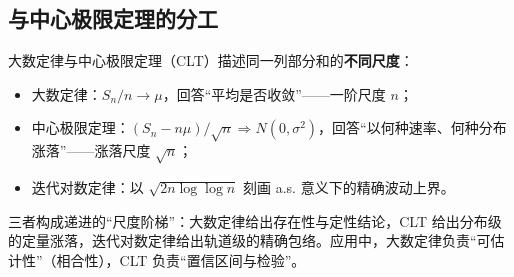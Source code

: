 \subsection{与中心极限定理的分工}

大数定律与中心极限定理（CLT）描述同一列部分和的\textbf{不同尺度}：

\begin{itemize}
    \item 大数定律：$S_n/n \to \mu$，回答“平均是否收敛”——一阶尺度 $n$；
    \item 中心极限定理：$(S_n - n\mu)/\sqrt{n} \Rightarrow N(0, \sigma^2)$，回答“以何种速率、何种分布涨落”——涨落尺度 $\sqrt{n}$；
    \item 迭代对数定律：以 $\sqrt{2n\log\log n}$ 刻画 a.s. 意义下的精确波动上界。
\end{itemize}

三者构成递进的“尺度阶梯”：大数定律给出存在性与定性结论，CLT 给出分布级的定量涨落，迭代对数定律给出轨道级的精确包络。应用中，大数定律负责“可估计性”（相合性），CLT 负责“置信区间与检验”。

